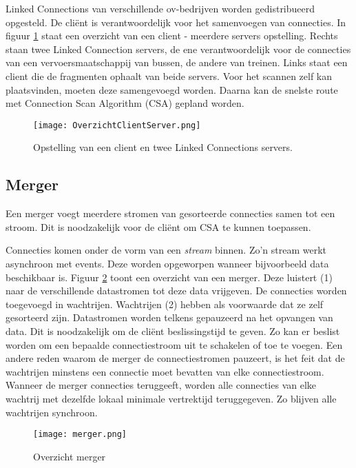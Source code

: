 Linked Connections van verschillende ov-bedrijven worden gedistribueerd opgesteld. De cli\"ent is verantwoordelijk voor het samenvoegen van connecties. In figuur \ref{overzichtclientserver} staat een overzicht van een client - meerdere servers opstelling. Rechts staan twee Linked Connection servers, de ene verantwoordelijk voor de connecties van een vervoersmaatschappij van bussen, de andere van treinen. Links staat een client die de fragmenten ophaalt van beide servers. Voor het scannen zelf kan plaatsvinden, moeten deze samengevoegd worden. Daarna kan de snelste route met Connection Scan Algorithm (CSA) gepland worden.

\begin{figure}[h!]
\centering
\texttt{[image: OverzichtClientServer.png]}
\label{overzichtclientserver}
\caption{Opstelling van een client en twee Linked Connections servers.}
\end{figure}

\subsection{Merger}

Een merger voegt meerdere stromen van gesorteerde connecties samen tot een stroom. Dit is noodzakelijk voor de cli\"ent om CSA te kunnen toepassen.

Connecties komen onder de vorm van een \textit{stream} binnen. Zo'n stream werkt asynchroon met events. Deze worden opgeworpen wanneer bijvoorbeeld data beschikbaar is. Figuur \ref{merger} toont een overzicht van een merger. Deze luistert (1) naar de verschillende datastromen tot deze data vrijgeven. De connecties worden toegevoegd in wachtrijen. Wachtrijen (2) hebben als voorwaarde dat ze zelf gesorteerd zijn. Datastromen worden telkens gepauzeerd na het opvangen van data. Dit is noodzakelijk om de cli\"ent beslissingstijd te geven. Zo kan er beslist worden om een bepaalde connectiestroom uit te schakelen of toe te voegen. Een andere reden waarom de merger de connectiestromen pauzeert, is het feit dat de wachtrijen minstens een connectie moet bevatten van elke connectiestroom. Wanneer de merger connecties teruggeeft, worden alle connecties van elke wachtrij met dezelfde lokaal minimale vertrektijd teruggegeven. Zo blijven alle wachtrijen synchroon.

\begin{figure}[h!]
\centering
\texttt{[image: merger.png]}
\caption{Overzicht merger}
\label{merger}
\end{figure}

